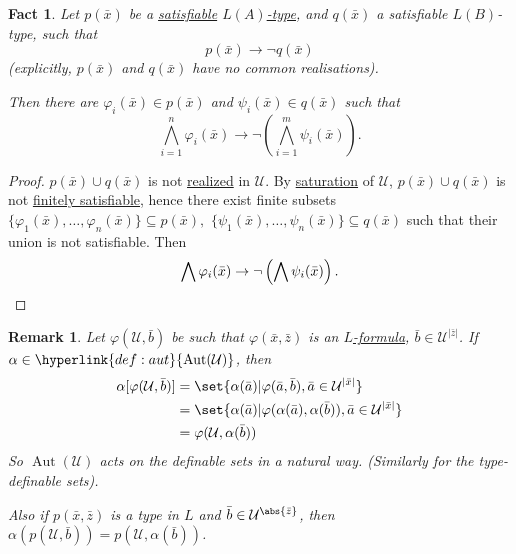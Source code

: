 \documentclass{article}
\DeclareMathOperator{\Aut}{Aut}
\newtheorem{nremark}[nthm]{Remark}
\newtheorem{nfact}[nthm]{Fact}
\begin{document}
\begin{nfact}\label{fact:7.2}
  Let $p(\bar{x})$ be a \hyperlink{def:type}{satisfiable} \hyperlink{def:typeparam}{$L(A)$-type}, and $q(\bar{x})$ a satisfiable $L(B)$-type, such that
  \begin{equation*}p(\bar{x})\to \lnot q(\bar{x})\end{equation*}
  (explicitly, $p(\bar{x})$ and $q(\bar{x})$ have no common realisations).

  Then there are $\varphi_i(\bar{x}) \in p(\bar{x})$ and $\psi_i(\bar{x}) \in q(\bar{x})$ such that
  \begin{equation*} \bigwedge_{i=1}^n\varphi_i(\bar{x})\to \lnot \left(\bigwedge_{i=1}^m\psi_i(\bar{x})\right).\end{equation*}
\end{nfact}
\begin{proof}
  $p(\bar{x})\cup q(\bar{x})$ is not \hyperlink{def:type}{realized} in $\mathcal{U}$.
  By \hyperlink{def:sat}{saturation} of $\mathcal{U}$, $p(\bar{x}) \cup q(\bar{x})$ is not \hyperlink{def:type}{finitely satisfiable},
  hence there exist finite subsets
  $\{\varphi_1(\bar{x}), \dotsc, \varphi_n(\bar{x})\} \subseteq p(\bar{x}),$
  $\{\psi_1(\bar{x}), \dotsc, \psi_n(\bar{x})\}\subseteq q(\bar{x})$
  such that their union is not satisfiable.
  Then
  \begin{equation*} \bigwedge \varphi_i(\bar{x}) \to \lnot\left(\bigwedge \psi_i(\bar{x}) \right). \qedhere \end{equation*}
\end{proof}
\begin{nremark}\label{rem:7.3}
  Let $ \varphi(\mathcal{U},\bar{b}) $ be such that $\varphi(\bar{x},\bar{z})$ is an \hyperlink{def:form}{$L$-formula}, $\bar{b}\in \mathcal{U}^{|\bar{z}|} $.
  If $ \alpha\in\hyperlink{def:aut}{\Aut(\mathcal{U})} $, then
  \begin{align*}
    \alpha[\varphi(\mathcal{U},\bar{b})] &= \set{\alpha(\bar{a})|\varphi(\bar{a},\bar{b}), \bar{a} \in \mathcal{U}^{|\bar{x}|}}\\
                                         &= \set{\alpha(\bar{a})|\varphi(\alpha(\bar{a}),\alpha(\bar{b})), \bar{a} \in \mathcal{U}^{|\bar{x}|}}\\
                                         &= \varphi(\mathcal{U},\alpha(\bar{b}))
  \end{align*}
  So $\Aut(\mathcal{U})$ acts on the definable sets in a natural way. (Similarly for the type-definable sets).
  
  Also if $p(\bar x, \bar z)$ is a type in $L$ and $\bar b \in \mathcal{U}^{\abs{\bar z}}$, then $\alpha(p(\mathcal{U}, \bar b)) = p(\mathcal{U}, \alpha(\bar b))$.
\end{nremark}
\end{document}
